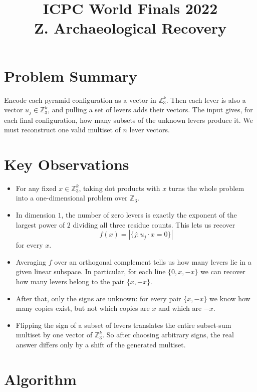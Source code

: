 \documentclass[11pt]{article}
\title{ICPC World Finals 2022\\Z. Archaeological Recovery}
\author{}
\date{}
\begin{document}
\maketitle

\section*{Problem Summary}

Encode each pyramid configuration as a vector in $\mathbb{Z}_3^k$. Then each lever is also a vector
$u_j \in \mathbb{Z}_3^k$, and pulling a set of levers adds their vectors. The input gives, for each final
configuration, how many subsets of the unknown levers produce it. We must reconstruct one valid
multiset of $n$ lever vectors.

\section*{Key Observations}

\begin{itemize}[leftmargin=*]
    \item For any fixed $x \in \mathbb{Z}_3^k$, taking dot products with $x$ turns the whole problem
    into a one-dimensional problem over $\mathbb{Z}_3$.
    \item In dimension $1$, the number of zero levers is exactly the exponent of the largest power of
    $2$ dividing all three residue counts. This lets us recover
    \[
    f(x) = |\{j : u_j \cdot x = 0\}|
    \]
    for every $x$.
    \item Averaging $f$ over an orthogonal complement tells us how many levers lie in a given linear
    subspace. In particular, for each line $\{0,x,-x\}$ we can recover how many levers belong to the
    pair $\{x,-x\}$.
    \item After that, only the signs are unknown: for every pair $\{x,-x\}$ we know how many copies
    exist, but not which copies are $x$ and which are $-x$.
    \item Flipping the sign of a subset of levers translates the entire subset-sum multiset by one vector
    of $\mathbb{Z}_3^k$. So after choosing arbitrary signs, the real answer differs only by a shift of
    the generated multiset.
\end{itemize}

\section*{Algorithm}
\end{document}
